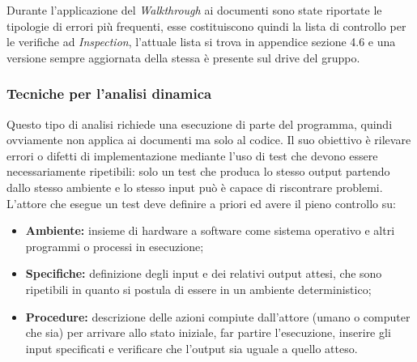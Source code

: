 \documentclass[a4paper]{article}
\begin{document}
					
				Durante l'applicazione del \emph{Walkthrough} ai documenti sono state riportate le tipologie di errori più frequenti, 
				esse costituiscono quindi la lista di controllo per le verifiche ad \emph{Inspection},
				l'attuale lista si trova in appendice sezione 4.6 e una versione sempre aggiornata della stessa è presente sul drive del gruppo.
				
			\subsubsection{Tecniche per l'analisi dinamica}
				Questo tipo di analisi richiede una esecuzione di parte del programma, quindi ovviamente non applica 
				ai documenti ma solo al codice. Il suo obiettivo è rilevare errori o difetti di implementazione 
				mediante l'uso di test che devono essere necessariamente ripetibili: solo un test che produca lo 
				stesso output partendo dallo stesso ambiente e lo stesso input può è capace di riscontrare problemi. 
				L'attore che esegue un test deve definire a priori ed avere il pieno controllo su:
				\begin{itemize}
					\item \textbf{Ambiente:} insieme di hardware a software come sistema operativo e altri programmi o 
					processi in esecuzione;
					\item \textbf{Specifiche:} definizione degli input e dei relativi output attesi, che sono ripetibili 
					in quanto si postula di essere in un ambiente deterministico;
					\item \textbf{Procedure:} descrizione delle azioni compiute dall'attore (umano o computer che sia) 
					per arrivare allo stato iniziale, far partire l'esecuzione, inserire gli input specificati e verificare 
					che l'output sia uguale a quello atteso.
				\end{itemize}
				
\end{document}
